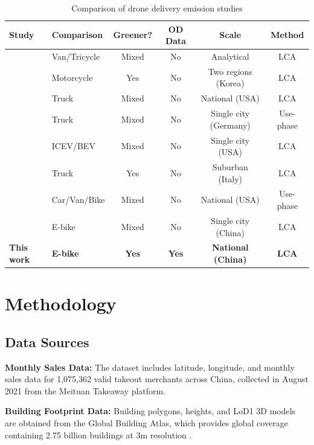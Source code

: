 \documentclass[11pt]{article}
\begin{document}
\begin{table}[h]
  \centering
  \caption{Comparison of drone delivery emission studies}
  \label{tab:lit_review}
  \begin{tabular}{l l c c c c}
    \toprule
    \textbf{Study} & \textbf{Comparison} & \textbf{Greener?} & \textbf{OD Data} & \textbf{Scale} & \textbf{Method} \\
    \midrule
    \textcite{figliozzi_lifecycle_2017} & Van/Tricycle & Mixed & No & Analytical & LCA \\
    \textcite{park_comparative_2018} & Motorcycle & Yes & No & Two regions (Korea) & LCA \\
    \textcite{stolaroff_energy_2018} & Truck & Mixed & No & National (USA) & LCA \\
    \textcite{kirschstein_comparison_2020} & Truck & Mixed & No & Single city (Germany) & Use-phase \\
    \textcite{yowtak_comparative_2020} & ICEV/BEV & Mixed & No & Single city (USA) & LCA \\
    \textcite{baldisseri_truck-based_2022} & Truck & Yes & No & Suburban (Italy) & LCA \\
    \textcite{rodrigues_drone_2022} & Car/Van/Bike & Mixed & No & National (USA) & Use-phase \\
    \textcite{li_beyond_2025} & E-bike & Mixed & No & Single city (China) & LCA \\
    \midrule
    \textbf{This work} & \textbf{E-bike} & \textbf{Yes} & \textbf{Yes} & \textbf{National (China)} & \textbf{LCA} \\
    \bottomrule
  \end{tabular}
\end{table}

\section{Methodology}

\subsection{Data Sources}

\textbf{Monthly Sales Data:} The dataset includes latitude, longitude, and monthly sales data for 1,075,362 valid takeout merchants across China, collected in August 2021 from the Meituan Takeaway platform.

\textbf{Building Footprint Data:} Building polygons, heights, and LoD1 3D models are obtained from the Global Building Atlas, which provides global coverage containing 2.75 billion buildings at 3m resolution \parencite{zhu_globalbuildingatlas_2025}.
\end{document}
